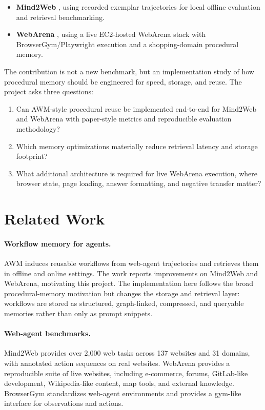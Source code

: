 \documentclass[11pt]{article}
\begin{document}
\begin{itemize}[leftmargin=*]
  \item \textbf{Mind2Web} \citep{deng2023mind2web}, using recorded exemplar trajectories for local offline evaluation and retrieval benchmarking.
  \item \textbf{WebArena} \citep{zhou2023webarena}, using a live EC2-hosted WebArena stack with BrowserGym/Playwright execution and a shopping-domain procedural memory.
\end{itemize}

The contribution is not a new benchmark, but an implementation study of how procedural memory should be engineered for speed, storage, and reuse. The project asks three questions:

\begin{enumerate}[leftmargin=*]
  \item Can AWM-style procedural reuse be implemented end-to-end for Mind2Web and WebArena with paper-style metrics and reproducible evaluation methodology?
  \item Which memory optimizations materially reduce retrieval latency and storage footprint?
  \item What additional architecture is required for live WebArena execution, where browser state, page loading, answer formatting, and negative transfer matter?
\end{enumerate}

\section{Related Work}

\paragraph{Workflow memory for agents.}
AWM \citep{wang2024awm} induces reusable workflows from web-agent trajectories and retrieves them in offline and online settings. The work reports improvements on Mind2Web and WebArena, motivating this project. The implementation here follows the broad procedural-memory motivation but changes the storage and retrieval layer: workflows are stored as structured, graph-linked, compressed, and queryable memories rather than only as prompt snippets.

\paragraph{Web-agent benchmarks.}
Mind2Web \citep{deng2023mind2web} provides over 2,000 web tasks across 137 websites and 31 domains, with annotated action sequences on real websites. WebArena \citep{zhou2023webarena} provides a reproducible suite of live websites, including e-commerce, forums, GitLab-like development, Wikipedia-like content, map tools, and external knowledge. BrowserGym \citep{dechezelles2024browsergym} standardizes web-agent environments and provides a gym-like interface for observations and actions.
\end{document}
